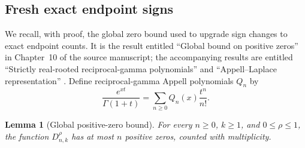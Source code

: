 \documentclass[11pt,letterpaper]{article}
\numberwithin{equation}{section}
\theoremstyle{plain}
\newtheorem{lemma}[theorem]{Lemma}
\theoremstyle{definition}
\theoremstyle{remark}
\begin{document}
\subsection{Fresh exact endpoint signs}

We recall, with proof, the global zero bound used to upgrade sign changes
to exact endpoint counts. It is the result entitled ``Global bound on
positive zeros'' in Chapter~10 of the source manuscript; the accompanying
results are entitled ``Strictly real-rooted reciprocal-gamma polynomials''
and ``Appell--Laplace representation'' \cite{ProveIt}.
Define reciprocal-gamma Appell polynomials $Q_n$ by
\[
 \frac{e^{xt}}{\Gamma(1+t)}=\sum_{n\geq0}Q_n(x)\frac{t^n}{n!}.
\]
\begin{lemma}[Global positive-zero bound]\label{cont26:lem:bif-global-count}
For every $n\geq0$, $k\geq1$, and $0\leq\rho\leq1$, the function
$D_{n,k}^{\rho}$ has at most $n$ positive zeros, counted with multiplicity.
\end{lemma}
\end{document}
